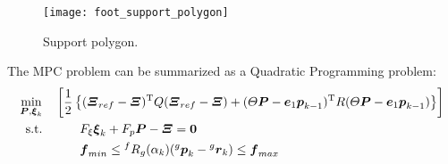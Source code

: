 \begin{figure}[!ht]
  \centering
  \texttt{[image: foot\_support\_polygon]}
  \caption{Support polygon. \label{fig:control_architecuture}}
\end{figure}
\par
The MPC problem can be summarized as a Quadratic Programming problem:
\[
\begin{split}
  \min_{\boldsymbol{P}, \boldsymbol{\xi}_k} &  \quad \left[  \frac{1}{2}\left\{ (\boldsymbol{\Xi}_{ref} - \boldsymbol{\Xi})^{\mathrm{T}} Q (\boldsymbol{\Xi}_{ref} - \boldsymbol{\Xi}) + (\Theta \boldsymbol{P} - \boldsymbol{e}_1 \boldsymbol{p}_{k-1}) ^{\mathrm{T}} R (\Theta \boldsymbol{P} - \boldsymbol{e}_1 \boldsymbol{p}_{k-1}) \right\} \right]\\
  \text{s.t.} & \quad \quad \quad  F_{\xi} \boldsymbol{\xi}_k + F_{p} \boldsymbol{P}  - \boldsymbol{\Xi} = \boldsymbol{0}\\
  & \quad \quad \quad  \boldsymbol{f}_{min} \le {}^f R_g(\alpha_k) ({}^g \boldsymbol{p}_k - {}^ g \boldsymbol{r}_k) \le \boldsymbol{f}_{max}
\end{split}
\]
